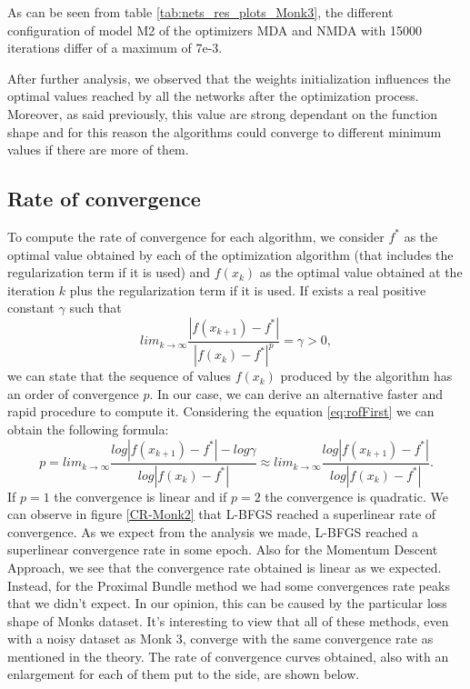 As can be seen from table \ref{tab:nets_res_plots_Monk3}, the different configuration of model M2 of the optimizers MDA and NMDA with 15000 iterations differ of a maximum of 7e-3. 

After further analysis, we observed that the weights initialization influences the  optimal values reached by all the networks after the optimization process. Moreover, as said previously, this value are strong dependant on the function shape and for this reason the algorithms could converge to different minimum values if there are more of them. 

\subsection{Rate of convergence}
\label{sec:rate_of_convergence}
To compute the rate of convergence for each algorithm, we consider $f^*$ as the optimal value obtained by each of the optimization algorithm (that includes the regularization term if it is used) and $f(x_{k})$ as the optimal value obtained at the iteration $k$ plus the regularization term if it is used. If exists a real positive constant $\gamma$ such that
\begin{equation}
\label{eq:rofFirst}
lim_{k\to \infty}\frac{|f(x_{k+1}) - f^* |}{|f(x_{k}) - f^*|^p} = \gamma > 0,
\end{equation}
we can state that the sequence of values $f(x_{k})$ produced by the algorithm has an order of convergence $p$. In our case, we can derive an alternative faster and rapid procedure to compute it. Considering the equation \ref{eq:rofFirst} we can obtain the following formula: 
\begin{equation}
p = lim_{k\to \infty}\frac{log |f(x_{k+1}) - f^* | - log \gamma}{log|f(x_{k}) - f^*|} \approx lim_{k\to \infty}\frac{log |f(x_{k+1}) - f^* |}{log|f(x_{k}) - f^*|}.
\end{equation}
If $p=1$ the convergence is linear and if $p=2$ the convergence is quadratic. We can observe in figure \ref{CR-Monk2} that L-BFGS reached a superlinear rate of convergence. 
As we expect from the analysis we made, L-BFGS reached a superlinear convergence rate in some epoch. Also for the Momentum Descent Approach, we see that the convergence rate obtained is linear as we expected. Instead, for the Proximal Bundle method we had some convergences rate peaks that we didn't expect. In our opinion, this can be caused by the particular loss shape of Monks dataset.
It's interesting to view that all of these methods, even with a noisy dataset as Monk 3, converge with the same convergence rate as mentioned in the theory. The rate of convergence curves obtained, also with an enlargement for each of them put to the side, are shown below.

